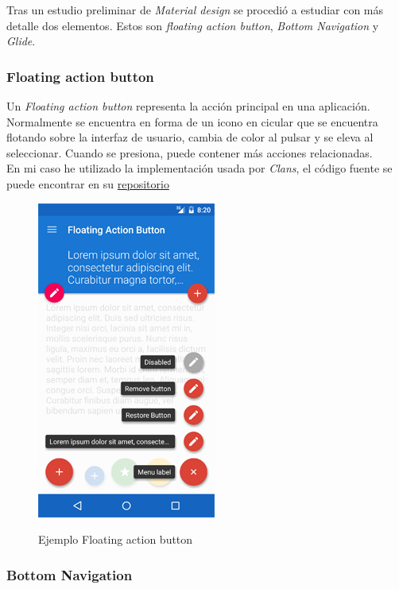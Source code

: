Tras un estudio preliminar de \textit{Material design} se procedió a estudiar con más detalle dos elementos. Estos son \textit{floating action button}, \textit{Bottom Navigation} y \textit{Glide}.

\subsubsection{Floating action button}

Un \textit{Floating action button} representa la acción principal en una aplicación. Normalmente se encuentra en forma de un icono en cicular que se encuentra flotando sobre la interfaz de usuario, cambia de color al pulsar y se eleva al seleccionar. Cuando se presiona, puede contener más acciones relacionadas.\\

En mi caso he utilizado la implementación usada por \textit{Clans}, el código fuente se puede encontrar en su \href{https://github.com/Clans/FloatingActionButton}{repositorio}

\begin{figure}[H] %
\centering
\includegraphics[scale=0.5]{imagenes/fab.png}  %
\label{fab}
\caption{Ejemplo Floating action button}
\end{figure}

\subsubsection{Bottom Navigation}

